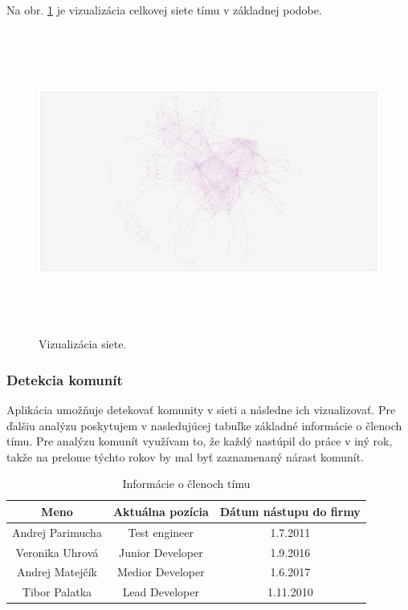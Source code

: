 \documentclass[slovak,master,public,dept460,male,cpdeclaration,oneside]{diploma}
\begin{document}
Na obr. \ref{team_net_celkovo} je vizualizácia celkovej siete tímu v základnej podobe.


\begin{figure}[H]
\centering
\includegraphics[width=16cm, height=10cm]{figures/team_net_celkovo}
\caption{Vizualizácia siete.}
\label{team_net_celkovo}
\end{figure}


\subsubsection{Detekcia komunít}
Aplikácia umožňuje detekovať komunity v sieti a následne ich vizualizovať. Pre ďalšiu analýzu poskytujem v nasledujúcej tabuľke základné informácie o členoch tímu. Pre analýzu komunít využívam to, že každý nastúpil do práce v iný rok, takže na prelome týchto rokov by mal byť zaznamenaný nárast komunít.

\begin{table}[h!]
\centering
\begin{tabular}{ c c c }
 Meno & Aktuálna pozícia &  Dátum nástupu do firmy \\ 
 \hline
 Andrej Parimucha & Test engineer  & 1.7.2011 \\  
 Veronika Uhrová & Junior Developer  & 1.9.2016  \\
 Andrej Matejčík & Medior Developer  & 1.6.2017 \\
 Tibor Palatka & Lead Developer & 1.11.2010 \\
\end{tabular}
\caption{Informácie o členoch tímu}
\end{table} 
\end{document}
